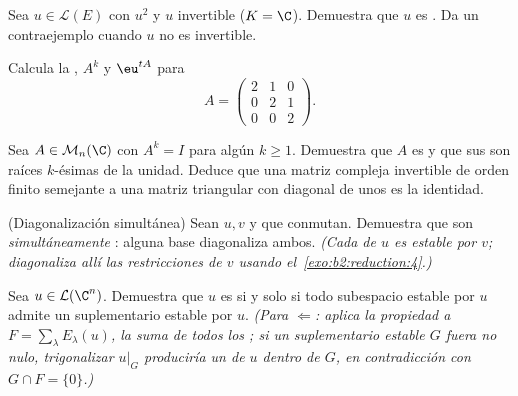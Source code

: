 \begin{exercise}[$\star\star$]\label{exo:b2:reduction:6}
Sea $u \in \mathcal{L}(E)$ con $u^2$  y $u$
invertible ($K = \C$). Demuestra que $u$ es . Da un
contraejemplo cuando $u$ no es invertible.
\end{exercise}

\begin{exercise}[$\star\star$]\label{exo:b2:reduction:7}
Calcula la , $A^k$ y $\eu^{tA}$ para
\[
A = \begin{pmatrix} 2 & 1 & 0\\ 0 & 2 & 1\\ 0 & 0 & 2
\end{pmatrix}.
\]
\end{exercise}

\begin{exercise}[$\star\star$]\label{exo:b2:reduction:8}
Sea $A \in \mathcal{M}_n(\C)$ con $A^k = I$ para algún $k \geq 1$.
Demuestra que $A$ es  y que sus  son
raíces $k$-ésimas de la unidad. Deduce que una matriz compleja
invertible de orden finito semejante a una matriz triangular con
diagonal de unos es la identidad.
\end{exercise}

\begin{exercise}[$\star\star\star$]\label{exo:b2:reduction:9}
(Diagonalización simultánea) Sean $u, v$  y que
conmutan. Demuestra que son \emph{simultáneamente}
: alguna base diagonaliza ambos. \emph{(Cada
 de $u$ es estable por $v$; diagonaliza allí las
restricciones de $v$ usando el~\cref{exo:b2:reduction:4}.)}
\end{exercise}

\begin{exercise}[$\star\star\star$]\label{exo:b2:reduction:10}
Sea $u \in \mathcal{L}(\C^n)$. Demuestra que $u$ es
 si y solo si todo subespacio estable por $u$ admite
un suplementario estable por $u$. \emph{(Para $\Leftarrow$: aplica la
propiedad a $F = \sum_\lambda E_\lambda(u)$, la suma de todos los
; si un suplementario estable $G$ fuera no
nulo, trigonalizar $u|_G$ produciría un  de $u$ dentro
de $G$, en contradicción con $G \cap F = \{0\}$.)}
\end{exercise}

